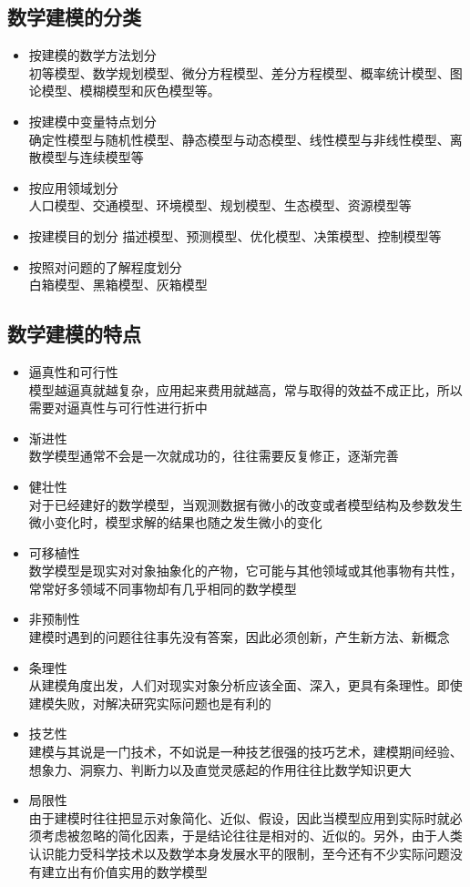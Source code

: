 \documentclass[openany]{progbookcn}
\begin{document}
\subsection{数学建模的分类}
\begin{itemize}
\item {按建模的数学方法划分}\\
初等模型、数学规划模型、微分方程模型、差分方程模型、概率统计模型、图论模型、模糊模型和灰色模型等。
\item {按建模中变量特点划分}\\
确定性模型与随机性模型、静态模型与动态模型、线性模型与非线性模型、离散模型与连续模型等
\item {按应用领域划分}\\
人口模型、交通模型、环境模型、规划模型、生态模型、资源模型等
\item {按建模目的划分}
描述模型、预测模型、优化模型、决策模型、控制模型等
\item {按照对问题的了解程度划分}\\
白箱模型、黑箱模型、灰箱模型

\end{itemize}

\subsection{数学建模的特点}
\begin{itemize}
\item{逼真性和可行性}\\
模型越逼真就越复杂，应用起来费用就越高，常与取得的效益不成正比，所以需要对逼真性与可行性进行折中
\item{渐进性}\\
数学模型通常不会是一次就成功的，往往需要反复修正，逐渐完善
\item{健壮性}\\
对于已经建好的数学模型，当观测数据有微小的改变或者模型结构及参数发生微小变化时，模型求解的结果也随之发生微小的变化
\item{可移植性}\\
数学模型是现实对对象抽象化的产物，它可能与其他领域或其他事物有共性，常常好多领域不同事物却有几乎相同的数学模型
\item{非预制性}\\
建模时遇到的问题往往事先没有答案，因此必须创新，产生新方法、新概念
\item{条理性}\\
从建模角度出发，人们对现实对象分析应该全面、深入，更具有条理性。即使建模失败，对解决研究实际问题也是有利的
\item{技艺性}\\
建模与其说是一门技术，不如说是一种技艺很强的技巧艺术，建模期间经验、想象力、洞察力、判断力以及直觉灵感起的作用往往比数学知识更大
\item {局限性}\\
由于建模时往往把显示对象简化、近似、假设，因此当模型应用到实际时就必须考虑被忽略的简化因素，于是结论往往是相对的、近似的。另外，由于人类认识能力受科学技术以及数学本身发展水平的限制，至今还有不少实际问题没有建立出有价值实用的数学模型
\end{itemize}
\end{document}
